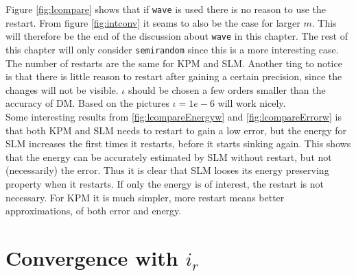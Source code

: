 Figure \ref{fig:lcompare} shows that if \texttt{wave} is used there is no reason to use the restart. From figure \ref{fig:intconv} it seams to also be the case for larger $m$. This will therefore be the end of the discussion about \texttt{wave} in this chapter. The rest of this chapter will only consider \texttt{semirandom} since this is a more interesting case. \\

The number of restarts are the same for KPM and SLM. Another ting to notice is that there is little reason to restart after gaining a certain precision, since the changes will not be visible. $\iota$ should be chosen a few orders smaller than the accuracy of DM. Based on the pictures $\iota = 1e-6$ will work nicely. \\

Some interesting results from \ref{fig:lcompareEnergyw} and \ref{fig:lcompareErrorw} is that both KPM and SLM needs to restart to gain a low error, but the energy for SLM increases the first times it restarts, before it starts sinking again. This shows that the energy can be accurately estimated by SLM without restart, but not (necessarily) the error.  Thus it is clear that SLM looses its energy preserving property when it restarts. If only the energy is of interest, the restart is not necessary. For KPM it is much simpler, more restart means better approximations, of both error and energy.\\

\section{Convergence with $i_r$} %

